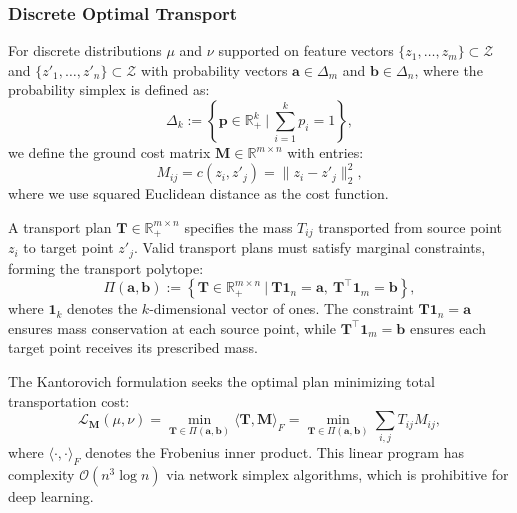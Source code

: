 \subsubsection{Discrete Optimal Transport}
\begin{sloppypar} 
For discrete distributions $\mu$ and $\nu$ supported on feature vectors $\{z_1, \dots, z_m\} \subset \mathcal{Z}$ and $\{z'_1, \dots, z'_n\} \subset \mathcal{Z}$ with probability vectors $\mathbf{a} \in \Delta_m$ and $\mathbf{b} \in \Delta_n$, where the probability simplex is defined as:
\begin{equation}
    \Delta_k := \left\{ \mathbf{p} \in \mathbb{R}^k_+ \ \Big| \ \sum_{i=1}^{k} p_i = 1 \right\},
\end{equation}
we define the ground cost matrix $\mathbf{M} \in \mathbb{R}^{m \times n}$ with entries:
\begin{equation}
    \label{eq:cost}
    M_{ij} = c(z_i, z'_j) = \|z_i - z'_j\|_2^2,
\end{equation}
where we use squared Euclidean distance as the cost function.
\end{sloppypar} 
A transport plan $\mathbf{T} \in \mathbb{R}^{m \times n}_+$ specifies the mass $T_{ij}$ transported from source point $z_i$ to target point $z'_j$. Valid transport plans must satisfy marginal constraints, forming the transport polytope:
\begin{equation}
    \Pi(\mathbf{a}, \mathbf{b}) := \left\{ \mathbf{T} \in \mathbb{R}^{m \times n}_+ \ \Big| \ \mathbf{T}\mathbf{1}_n = \mathbf{a}, \ \mathbf{T}^\top\mathbf{1}_m = \mathbf{b} \right\},
\end{equation}
where $\mathbf{1}_k$ denotes the $k$-dimensional vector of ones. The constraint $\mathbf{T}\mathbf{1}_n = \mathbf{a}$ ensures mass conservation at each source point, while $\mathbf{T}^\top\mathbf{1}_m = \mathbf{b}$ ensures each target point receives its prescribed mass.

The Kantorovich formulation seeks the optimal plan minimizing total transportation cost:
\begin{equation}
    \mathcal{L}_{\mathbf{M}}(\mu, \nu) = \min_{\mathbf{T} \in \Pi(\mathbf{a}, \mathbf{b})} \langle \mathbf{T}, \mathbf{M} \rangle_F = \min_{\mathbf{T} \in \Pi(\mathbf{a}, \mathbf{b})} \sum_{i,j} T_{ij} M_{ij},
\end{equation}
where $\langle \cdot, \cdot \rangle_F$ denotes the Frobenius inner product. This linear program has complexity $\mathcal{O}(n^3 \log n)$ via network simplex algorithms, which is prohibitive for deep learning.

